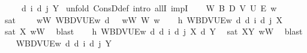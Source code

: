 \begin{isabellebody}
\ \ \ {\isachardoublequoteopen}{\isasymGamma}\ {\isasymTurnstile}\ {\isasymD}\isactrlsup d\ i\ {\isacharparenleft}{\kern0pt}{\isasymB}\isactrlsup d\ j\ Y{\isacharparenright}{\kern0pt}{\isachardoublequoteclose}\isanewline
%
\isadelimproof
%
\endisadelimproof
%
\isatagproof
{}\isamarkupfalse%
\ {\isacharparenleft}{\kern0pt}unfold\ ConsD{\isacharunderscore}{\kern0pt}def{\isacharcomma}{\kern0pt}\ intro\ allI\ impI{\isacharparenright}{\kern0pt}\isanewline
\ \ \isamarkupfalse%
\ W\ B\ D\ V\ U\ E\ w\isanewline
\ \ \isamarkupfalse%
\ sat{\isacharcolon}{\kern0pt}\ {\isachardoublequoteopen}{\isasymforall}{\isasymgamma}{\isachardot}{\kern0pt}\ {\isasymGamma}\ {\isasymgamma}\ {\isasymlongrightarrow}\ {\isacharparenleft}{\kern0pt}{\isasymforall}w{\isacharcolon}{\kern0pt}W{\isachardot}{\kern0pt}\ {\isasymlangle}W{\isacharcomma}{\kern0pt}B{\isacharcomma}{\kern0pt}D{\isacharcomma}{\kern0pt}V{\isacharcomma}{\kern0pt}U{\isacharcomma}{\kern0pt}E{\isasymrangle}{\isacharcomma}{\kern0pt}w\ {\isasymTurnstile}\isactrlsup d\ {\isasymgamma}{\isacharparenright}{\kern0pt}{\isachardoublequoteclose}\ \ wW{\isacharcolon}{\kern0pt}\ {\isachardoublequoteopen}W\ w{\isachardoublequoteclose}\isanewline
\ \ \isamarkupfalse%
\ h{}{\isacharcolon}{\kern0pt}\ {\isachardoublequoteopen}{\isasymlangle}W{\isacharcomma}{\kern0pt}B{\isacharcomma}{\kern0pt}D{\isacharcomma}{\kern0pt}V{\isacharcomma}{\kern0pt}U{\isacharcomma}{\kern0pt}E{\isasymrangle}{\isacharcomma}{\kern0pt}w\ {\isasymTurnstile}\isactrlsup d\ {\isasymD}\isactrlsup d\ i\ {\isacharparenleft}{\kern0pt}{\isasymB}\isactrlsup d\ j\ X{\isacharparenright}{\kern0pt}{\isachardoublequoteclose}\ \isamarkupfalse%
\ sat\ X\ wW\ \isamarkupfalse%
\ blast\isanewline
\ \ \isamarkupfalse%
\ h{}{\isacharcolon}{\kern0pt}\ {\isachardoublequoteopen}{\isasymlangle}W{\isacharcomma}{\kern0pt}B{\isacharcomma}{\kern0pt}D{\isacharcomma}{\kern0pt}V{\isacharcomma}{\kern0pt}U{\isacharcomma}{\kern0pt}E{\isasymrangle}{\isacharcomma}{\kern0pt}w\ {\isasymTurnstile}\isactrlsup d\ {\isasymD}\isactrlsup d\ i\ {\isacharparenleft}{\kern0pt}{\isasymB}\isactrlsup d\ j\ {\isacharparenleft}{\kern0pt}X\ {\isasymsupset}\isactrlsup d\ Y{\isacharparenright}{\kern0pt}{\isacharparenright}{\kern0pt}{\isachardoublequoteclose}\ \isamarkupfalse%
\ sat\ XY\ wW\ \isamarkupfalse%
\ blast\isanewline
\ \ \isamarkupfalse%
\ {\isachardoublequoteopen}{\isasymlangle}W{\isacharcomma}{\kern0pt}B{\isacharcomma}{\kern0pt}D{\isacharcomma}{\kern0pt}V{\isacharcomma}{\kern0pt}U{\isacharcomma}{\kern0pt}E{\isasymrangle}{\isacharcomma}{\kern0pt}w\ {\isasymTurnstile}\isactrlsup d\ {\isasymD}\isactrlsup d\ i\ {\isacharparenleft}{\kern0pt}{\isasymB}\isactrlsup d\ j\ Y{\isacharparenright}{\kern0pt}{\isachardoublequoteclose}\ \isamarkupfalse%

\end{isabellebody}
